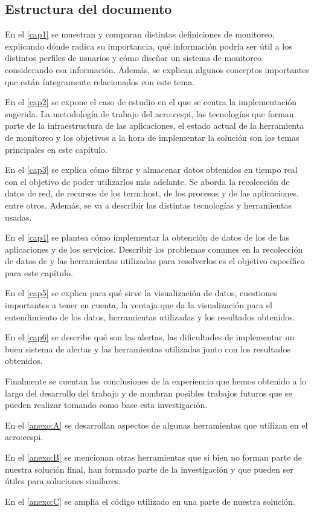 \subsection{Estructura del documento}
\label{estructura}

En el \autoref{cap1} se muestran y comparan distintas definiciones de
monitoreo, explicando dónde radica su importancia, qué información podría ser
útil a los distintos perfiles de usuarios y cómo diseñar un sistema de
monitoreo considerando esa información. Además, se explican algunos conceptos
importantes que están íntegramente relacionados con este tema.

En el \autoref{cap2} se expone el caso de estudio en el que se centra la
implementación sugerida. La metodología de trabajo del \gls{acro:cespi}, las
tecnologías que forman parte de la infraestructura de las aplicaciones, el
estado actual de la herramienta de monitoreo y los objetivos a la hora de
implementar la solución son los temas principales en este capítulo.

En el \autoref{cap3} se explica cómo filtrar y almacenar datos obtenidos en
tiempo real con el objetivo de poder utilizarlos más adelante. Se aborda la
recolección de datos de red, de recursos de los \gls{term:host}, de los
procesos y de las aplicaciones, entre otros. Además, se va a describir las
distintas tecnologías y herramientas usadas.

En el \autoref{cap4} se plantea cómo implementar la obtención de datos de los
 de las aplicaciones y de los servicios. Describir los problemas
comunes en la recolección de datos de  y las herramientas utilizadas
para resolverlos es el objetivo específico para este capítulo.

En el \autoref{cap5} se explica para qué sirve la visualización de datos,
cuestiones importantes a tener en cuenta, la ventaja que da la visualización
para el entendimiento de los datos, herramientas utilizadas y los resultados
obtenidos.

En el \autoref{cap6} se describe qué son las alertas, las dificultades de
implementar un buen sistema de alertas y las herramientas utilizadas junto con
los resultados obtenidos.

Finalmente se cuentan las conclusiones de la experiencia que hemos obtenido a
lo largo del desarrollo del trabajo y de nombran posibles trabajos futuros
que se pueden realizar tomando como base esta investigación.

En el \autoref{anexo:A} se desarrollan aspectos de algunas herramientas que
utilizan en el \gls{acro:cespi}.

En el \autoref{anexo:B} se mencionan otras herramientas que si bien no forman
parte de nuestra solución final, han formado parte de la investigación y que
pueden ser útiles para soluciones similares.

En el \autoref{anexo:C} se amplía el código utilizado en una parte de nuestra
solución.
